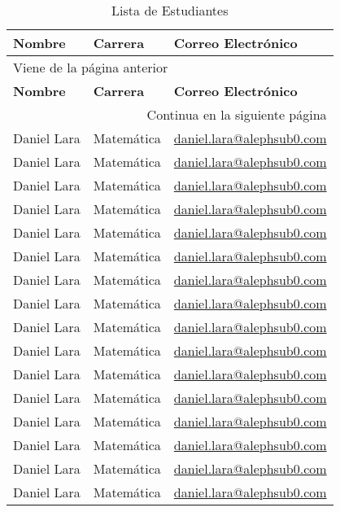 \documentclass[a4,10pt]{aleph-notas}
\begin{document}
\begin{center}
 \begin{longtable}{lll}
  \caption{Lista de Estudiantes}\\
        \toprule
        \textbf{Nombre}  & \textbf{Carrera}  &  \textbf{Correo Electrónico} \\
        \midrule
  \endfirsthead
        \multicolumn{3}{l}{\footnotesize Viene de la página anterior}\\
        \toprule
        \textbf{Nombre}  & \textbf{Carrera}  &  \textbf{Correo Electrónico} \\ \midrule
  \endhead
        \bottomrule  \multicolumn{3}{r}{\footnotesize Continua en la siguiente página}
  \endfoot 
        \bottomrule
  \endlastfoot
%  
  Daniel Lara      &	Matemática	& \url{daniel.lara@alephsub0.com}  \\
  Daniel Lara      &	Matemática	& \url{daniel.lara@alephsub0.com}  \\
  Daniel Lara      &	Matemática	& \url{daniel.lara@alephsub0.com}  \\
  Daniel Lara      &	Matemática	& \url{daniel.lara@alephsub0.com}  \\
  Daniel Lara      &	Matemática	& \url{daniel.lara@alephsub0.com}  \\
  Daniel Lara      &	Matemática	& \url{daniel.lara@alephsub0.com}  \\
  Daniel Lara      &	Matemática	& \url{daniel.lara@alephsub0.com}  \\
  Daniel Lara      &	Matemática	& \url{daniel.lara@alephsub0.com}  \\
  Daniel Lara      &	Matemática	& \url{daniel.lara@alephsub0.com}  \\
  Daniel Lara      &	Matemática	& \url{daniel.lara@alephsub0.com}  \\
  Daniel Lara      &	Matemática	& \url{daniel.lara@alephsub0.com}  \\
  Daniel Lara      &	Matemática	& \url{daniel.lara@alephsub0.com}  \\
  Daniel Lara      &	Matemática	& \url{daniel.lara@alephsub0.com}  \\
  Daniel Lara      &	Matemática	& \url{daniel.lara@alephsub0.com}  \\
  Daniel Lara      &	Matemática	& \url{daniel.lara@alephsub0.com}  \\
  Daniel Lara      &	Matemática	& \url{daniel.lara@alephsub0.com}  \\
  Daniel Lara      &	Matemática	& \url{daniel.lara@alephsub0.com}  \\

\end{longtable}
\end{center}
\end{document}
